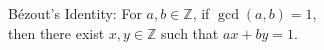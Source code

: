 \documentclass[preview]{standalone}
\begin{document}
\begin{center}
Bézout's Identity: For $a, b \in \mathbb{Z}$, if $\gcd(a, b) = 1$, \\then there exist $x, y \in \mathbb{Z}$ such that $ax + by = 1$.
\end{center}
\end{document}
